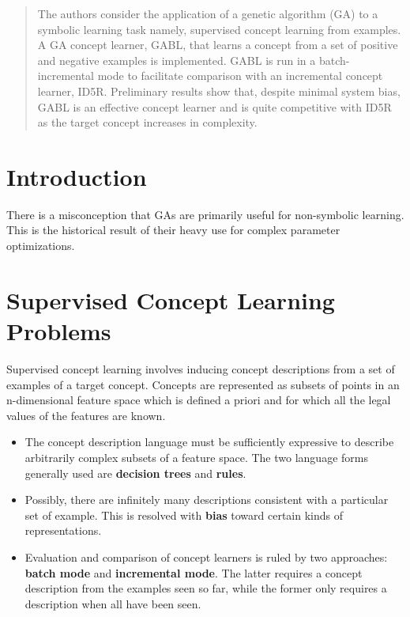 \documentclass[../main.tex]{subfiles}
\begin{document}
\begin{abstract}
The authors consider the application of a genetic algorithm (GA) to a symbolic learning task namely, supervised concept
learning from examples. A GA concept learner, GABL, that learns a concept from a set of positive and negative examples
is implemented. GABL is run in a batch-incremental mode to facilitate comparison with an incremental concept learner,
ID5R. Preliminary results show that, despite minimal system bias, GABL is an effective concept learner and is quite
competitive with ID5R as the target concept increases in complexity.
\end{abstract}

\begin{mdframed}
\end{mdframed}

\section{Introduction}

There is a misconception that GAs are primarily useful for non-symbolic learning. This is the historical result of
their heavy use for complex parameter optimizations.

\section{Supervised Concept Learning Problems}
Supervised concept learning involves inducing concept descriptions from a set of examples of a target concept. Concepts
are represented as subsets of points in an n-dimensional feature space which is defined a priori and for which all the
legal values of the features are known.

\begin{itemize}
	\item The concept description language must be sufficiently expressive to describe arbitrarily
	complex subsets of a feature space. The two language forms generally used are \textbf{decision trees} and
	\textbf{rules}.
	\item Possibly, there are infinitely many descriptions consistent with a particular set of example. This is
	resolved with \textbf{bias} toward certain kinds of representations.
	\item Evaluation and comparison of concept learners is ruled by two approaches: \textbf{batch mode} and
	\textbf{incremental mode}. The latter requires a concept description from the examples seen so far, while the
	former only requires a description when all have been seen.
\end{itemize}
\end{document}
